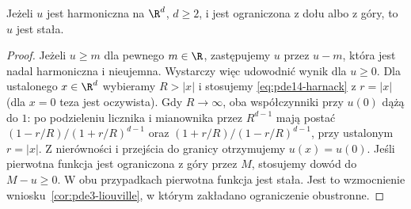 \begin{wniosek}
\label{cor:pde14-liouville}
Jeżeli $u$ jest harmoniczna na $\R^d$, $d\ge2$, i jest
ograniczona z dołu albo z góry, to $u$ jest stała.
\end{wniosek}
\begin{proof}
Jeżeli $u\ge m$ dla pewnego $m\in\R$, zastępujemy
$u$ przez $u-m$, która jest nadal harmoniczna i nieujemna.
Wystarczy więc udowodnić wynik dla $u\ge0$.
Dla ustalonego $x\in\R^d$ wybieramy $R>|x|$ i stosujemy
\eqref{eq:pde14-harnack} z $r=|x|$ (dla $x=0$ teza jest
oczywista). Gdy $R\to\infty$, oba współczynniki przy $u(0)$
dążą do $1$: po podzieleniu licznika i mianownika
przez $R^{d-1}$ mają postać
$(1-r/R)/(1+r/R)^{d-1}$ oraz
$(1+r/R)/(1-r/R)^{d-1}$, przy ustalonym $r=|x|$. Z nierówności i przejścia do granicy otrzymujemy
$u(x)=u(0)$. Jeśli pierwotna funkcja jest ograniczona
z góry przez $M$, stosujemy dowód do $M-u\ge0$.
W obu przypadkach pierwotna funkcja jest stała.
Jest to wzmocnienie wniosku~\ref{cor:pde3-liouville},
w którym zakładano ograniczenie obustronne.
\end{proof}

